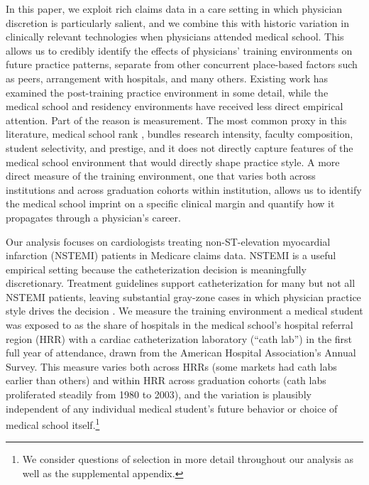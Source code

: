\documentclass[12pt]{article}
\begin{document}
In this paper, we exploit rich claims data in a care setting in which physician discretion is particularly salient, and we combine this with historic variation in clinically relevant technologies when physicians attended medical school. This allows us to credibly identify the effects of physicians' training environments on future practice patterns, separate from other concurrent place-based factors such as peers, arrangement with hospitals, and many others. Existing work has examined the post-training practice environment in some detail, while the medical school and residency environments have received less direct empirical attention. Part of the reason is measurement. The most common proxy in this literature, medical school rank \citep{schnell2018, doyle_jr_returns_2010}, bundles research intensity, faculty composition, student selectivity, and prestige, and it does not directly capture features of the medical school environment that would directly shape practice style. A more direct measure of the training environment, one that varies both across institutions and across graduation cohorts within institution, allows us to identify the medical school imprint on a specific clinical margin and quantify how it propagates through a physician's career.

Our analysis focuses on cardiologists treating non-ST-elevation myocardial infarction (NSTEMI) patients in Medicare claims data. NSTEMI is a useful empirical setting because the catheterization decision is meaningfully discretionary. Treatment guidelines support catheterization for many but not all NSTEMI patients, leaving substantial gray-zone cases in which physician practice style drives the decision \citep{chan2011, amsterdam2014}. We measure the training environment a medical student was exposed to as the share of hospitals in the medical school's hospital referral region (HRR) with a cardiac catheterization laboratory (``cath lab'') in the first full year of attendance, drawn from the American Hospital Association's Annual Survey. This measure varies both across HRRs (some markets had cath labs earlier than others) and within HRR across graduation cohorts (cath labs proliferated steadily from 1980 to 2003), and the variation is plausibly independent of any individual medical student's future behavior or choice of medical school itself.\footnote{We consider questions of selection in more detail throughout our analysis as well as the supplemental appendix.}
\end{document}
